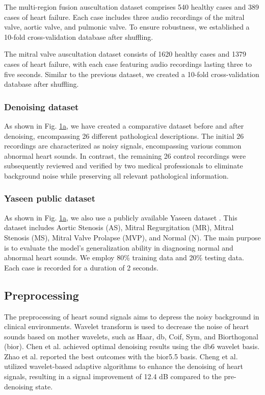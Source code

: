 The multi-region fusion auscultation dataset comprises 540 healthy cases and 389 cases of heart failure. Each case includes three audio recordings of the mitral valve, aortic valve, and pulmonic valve. To ensure robustness, we established a 10-fold cross-validation database after shuffling.

The mitral valve auscultation dataset consists of 1620 healthy cases and 1379 cases of heart failure, with each case featuring audio recordings lasting three to five seconds. Similar to the previous dataset, we created a 10-fold cross-validation database after shuffling.
\subsubsection{Denoising dataset}
As shown in Fig. \hyperref[FIG:Methodology]{1a}, we have created a comparative dataset before and after denoising, encompassing 26 different pathological descriptions. The initial 26 recordings are characterized as noisy signals, encompassing various common abnormal heart sounds. In contrast, the remaining 26 control recordings were subsequently reviewed and verified by two medical professionals to eliminate background noise while preserving all relevant pathological information.
\subsubsection{Yaseen public dataset}
As shown in Fig. \hyperref[FIG:Methodology]{1a}, we also use a publicly available Yaseen dataset \cite{son2018classification}. This dataset includes Aortic Stenosis (AS), Mitral Regurgitation (MR), Mitral Stenosis (MS), Mitral Valve Prolapse (MVP), and Normal (N). The main purpose is to evaluate the model's generalization ability in diagnosing normal and abnormal heart sounds. We employ 80\% training data and 20\% testing data. Each case is recorded for a duration of 2 seconds.
\subsection{Preprocessing}
The preprocessing of heart sound signals aims to depress the noisy background in clinical environments. Wavelet transform is used to decrease the noise of heart sounds based on mother wavelets, such as Haar, db, Coif, Sym, and Biorthogonal (bior). Chen et al. \cite{2006Research} achieved optimal denoising results using the db6 wavelet basis. Zhao et al. \cite{2010Research} reported the best outcomes with the bior5.5 basis. Cheng et al. \cite{cheng2014denoising} utilized wavelet-based adaptive algorithms to enhance the denoising of heart signals, resulting in a signal improvement of 12.4 dB compared to the pre-denoising state.

